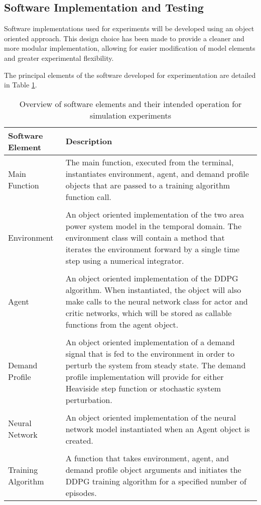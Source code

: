 \subsection{Software Implementation and Testing}\label{sec:software}
Software implementations used for experiments will be developed using an object oriented approach. This design choice has been made to provide a cleaner and more modular implementation, allowing for easier modification of model elements and greater experimental flexibility.

The principal elements of the software developed for experimentation are detailed in Table \ref{tab:software_elements}.
\begin{table}[h]
	\centering
	\caption{Overview of software elements and their intended operation for simulation experiments}
	\begin{tabular}{lp{10cm}}
		\toprule
		\textbf{Software Element} & \textbf{Description} \\
		\midrule
		Main Function & The main function, executed from the terminal, instantiates environment, agent, and demand profile objects that are passed to a training algorithm function call.\\
		 & \\
		Environment & An object oriented implementation of the two area power system model in the temporal domain. The environment class will contain a method that iterates the environment forward by a single time step using a numerical integrator.\\
		 & \\
		Agent & An object oriented implementation of the DDPG algorithm. When instantiated, the object will also make calls to the neural network class for actor and critic networks, which will be stored as callable functions from the agent object. \\
		 & \\
		Demand Profile & An object oriented implementation of a demand signal that is fed to the environment in order to perturb the system from steady state. The demand profile implementation will provide for either Heaviside step function or stochastic system perturbation.\\
		 & \\
		Neural Network & An object oriented implementation of the neural network model instantiated when an Agent object is created.\\
		 & \\
		Training Algorithm & A function that takes environment, agent, and demand profile object arguments and initiates the DDPG training algorithm for a specified number of episodes.\\
		\bottomrule
	\end{tabular}
	\label{tab:software_elements}
\end{table}

